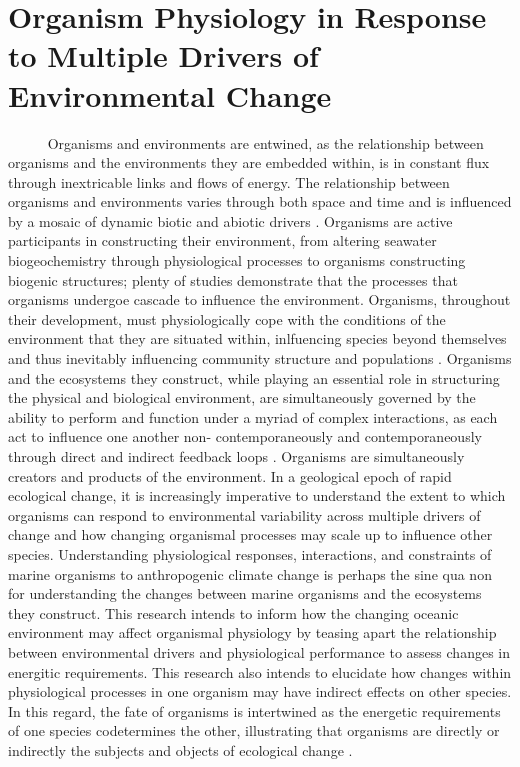 \documentclass[
]{article}
\author{}
\date{\vspace{-2.5em}}
\begin{document}
\hypertarget{organism-physiology-in-response-to-multiple-drivers-of-environmental-change}{%
\section{Organism Physiology in Response to Multiple Drivers of
Environmental
Change}\label{organism-physiology-in-response-to-multiple-drivers-of-environmental-change}}

~~~~~ Organisms and environments are entwined, as the relationship
between organisms and the environments they are embedded within, is in
constant flux through inextricable links and flows of energy. The
relationship between organisms and environments varies through both
space and time and is influenced by a mosaic of dynamic biotic and
abiotic drivers \citep{connell1977mechanisms, menge1987community}.
Organisms are active participants in constructing their environment,
from altering seawater biogeochemistry through physiological processes
to organisms constructing biogenic structures; plenty of studies
demonstrate that the processes that organisms undergoe cascade to
influence the environment\citep{lewontin1983organism,estes1974sea}.
Organisms, throughout their development, must physiologically cope with
the conditions of the environment that they are situated within,
inlfuencing species beyond themselves and thus inevitably influencing
community structure and populations \citep{bozinovic2015physiological}.
Organisms and the ecosystems they construct, while playing an essential
role in structuring the physical and biological environment, are
simultaneously governed by the ability to perform and function under a
myriad of complex interactions, as each act to influence one another
non- contemporaneously and contemporaneously through direct and indirect
feedback loops \citep{levin1974disturbance,paine1980food}. Organisms are
simultaneously creators and products of the environment. In a geological
epoch of rapid ecological change, it is increasingly imperative to
understand the extent to which organisms can respond to environmental
variability across multiple drivers of change and how changing
organismal processes may scale up to influence other species.
Understanding physiological responses, interactions, and constraints of
marine organisms to anthropogenic climate change is perhaps the sine qua
non for understanding the changes between marine organisms and the
ecosystems they construct. This research intends to inform how the
changing oceanic environment may affect organismal physiology by teasing
apart the relationship between environmental drivers and physiological
performance to assess changes in energitic requirements. This research
also intends to elucidate how changes within physiological processes in
one organism may have indirect effects on other species. In this regard,
the fate of organisms is intertwined as the energetic requirements of
one species codetermines the other, illustrating that organisms are
directly or indirectly the subjects and objects of ecological change
\citep{lewontin1983organism}.
\end{document}
